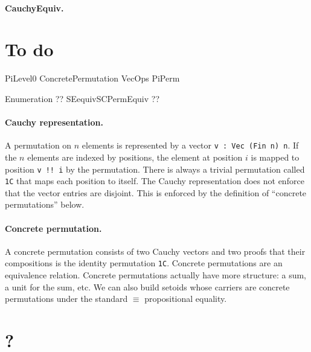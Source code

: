 \documentclass{article}
\begin{document}
\paragraph*{CauchyEquiv.} 

\section{To do}

PiLevel0
ConcretePermutation
VecOps
PiPerm

Enumeration ??
SEequivSCPermEquiv ??


\paragraph*{Cauchy representation.} A permutation on $n$ elements is represented by a vector \texttt{v : Vec (Fin n) n}. If the $n$ elements are indexed by positions, the element at position $i$ is mapped to position \texttt{v !! i} by the permutation. There is always a trivial permutation called \texttt{1C} that maps each position to itself. The Cauchy representation does not enforce that the vector entries are disjoint. This is enforced by the definition of ``concrete permutations'' below. 

\paragraph*{Concrete permutation.} A concrete permutation consists of two Cauchy vectors and two proofs that their compositions is the identity permutation \texttt{1C}. Concrete permutations are an equivalence relation. Concrete permutations actually have more structure: a sum, a unit for the sum, etc. We can also build setoids whose carriers are concrete permutations under the standard $\equiv$ propositional equality.

\section{?}


\end{document}
